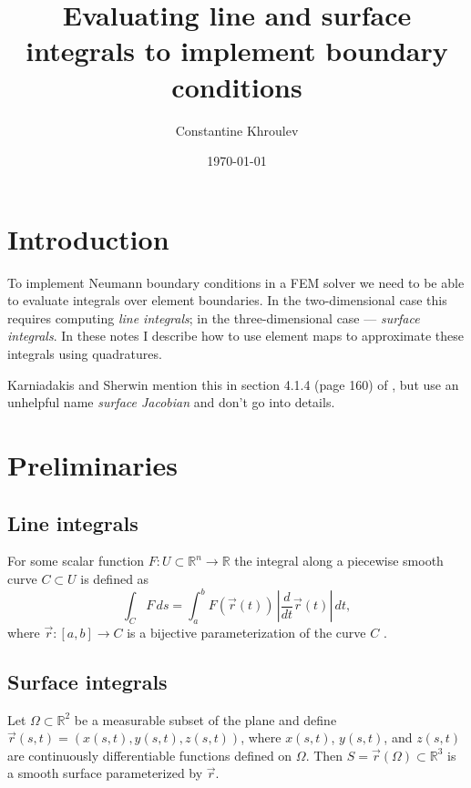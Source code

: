 \documentclass[11pt]{article}
\author{Constantine Khroulev}
\date{\today}
\title{Evaluating line and surface integrals to implement boundary conditions}
\begin{document}
\maketitle
\tableofcontents

\newcommand{\dx}{\Delta x}
\newcommand{\dy}{\Delta y}
\newcommand{\Real}{\mathbb{R}}
\newcommand{\diff}[2]{\frac{\partial #1}{\partial #2}}
\newcommand{\rs}{\R_{s}}
\newcommand{\rt}{\R_{t}}
\newcommand{\R}{\vec r}
\newcommand{\N}{\vec n}
\newcommand{\rRef}{\R_{*}}

\section{Introduction}
\label{sec-1}

To implement Neumann boundary conditions in a FEM solver we need to be
able to evaluate integrals over element boundaries. In the
two-dimensional case this requires computing \emph{line integrals}; in the
three-dimensional case --- \emph{surface integrals}. In these notes I
describe how to use element maps to approximate these integrals using
quadratures.

Karniadakis and Sherwin mention this in section 4.1.4 (page 160) of
\cite{KarniadakisSherwin}, but use an unhelpful name \emph{surface
Jacobian} and don't go into details.

\section{Preliminaries}
\label{sec-2}

\subsection{Line integrals}
\label{sec-2-1}

For some scalar function $F : U \subset \Real^{n} \to \Real$
the integral along a piecewise smooth curve $C \subset U$ is defined as
\begin{equation}
\label{eq:4}
\int_{C} F\, ds = \int_{a}^{b} F(\R(t))\, \left| \frac{d}{dt}\R(t) \right|\, dt,
\end{equation}
where $\R: [a, b] \to C$ is a bijective parameterization of the curve
$C$ \cite{Nikolsky1977}.

\subsection{Surface integrals}
\label{sec-2-2}

Let $\Omega \subset \Real^{2}$ be a measurable subset of the
plane and define $\R(s,t) = (x(s,t), y(s,t), z(s,t))$, where $x(s,
t)$, $y(s, t)$, and $z(s, t)$ are continuously differentiable
functions defined on $\Omega$. Then $S = \R(\Omega) \subset
\Real^{3}$ is a smooth surface parameterized by $\R$.
\end{document}
